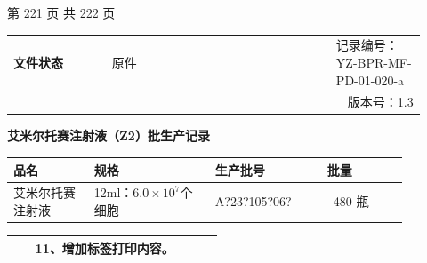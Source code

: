 \documentclass[UTF8,10pt,a4paper,fontset=fandol]{ctexart}
\newcommand{\fieldvalue}[1]{#1}
\newcommand{\handwritten}[1]{#1}
\begin{document}
\normalsize

\begin{center}
第 221 页 共 222 页
\end{center}

\newpage

\begin{center}
{\small
\begin{tabular}{@{}p{0.22\linewidth}p{0.50\linewidth}p{0.20\linewidth}@{}}
\textbf{文件状态} &
\fieldvalue{原件} &
记录编号：\fieldvalue{YZ-BPR-MF-PD-01-020-a}
\\[2pt]
& \multicolumn{2}{r}{
\fieldvalue{版本号：1.3}}
\end{tabular}

\vspace{2pt}

\textbf{艾米尔托赛注射液（Z2）批生产记录}

\vspace{3pt}

\begin{tabular}{|p{0.18\linewidth}|p{0.27\linewidth}|p{0.25\linewidth}|p{0.18\linewidth}|}
\hline
\centering 品名 &
\centering 规格 &
\centering 生产批号 &
\centering 批量
\\ \hline
\centering \fieldvalue{艾米尔托赛注射液} &
\centering \fieldvalue{12ml：$6.0\times10^{7}$个细胞} &
\centering \fieldvalue{\handwritten{A?23?105?06?}} &
\centering \fieldvalue{200--480 瓶}
\\ \hline
\end{tabular}

\vspace{3pt}

\begin{tabular}{|p{0.10\linewidth}|p{0.72\linewidth}|p{0.14\linewidth}|}
\hline
& 11、增加标签打印内容。 &
\\ \hline
\end{tabular}
}
\end{center}

\end{document}

